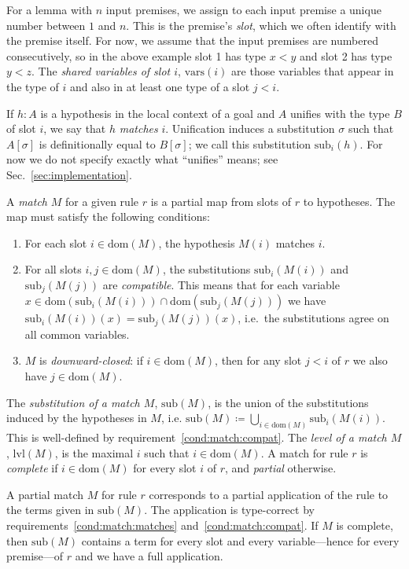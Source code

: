 \documentclass[runningheads]{llncs}
\newcommand{\vars}{\ensuremath{\mathrm{vars}}}
\newcommand{\dom}{\ensuremath{\mathrm{dom}}}
\newcommand{\sub}{\ensuremath{\mathrm{sub}}}
\newcommand{\lvl}{\ensuremath{\mathrm{lvl}}}
\begin{document}
For a lemma with $n$ input premises, we assign to each input premise a unique number between $1$ and $n$.
This is the premise's \emph{slot}, which we often identify with the premise itself.
For now, we assume that the input premises are numbered consecutively, so in the above example slot 1 has type $x < y$ and slot 2 has type $y < z$.
The \emph{shared variables of slot $i$}, $\vars(i)$ are those variables that appear in the type of $i$ and also in at least one type of a slot $j < i$.

If $h : A$ is a hypothesis in the local context of a goal and $A$ unifies with the type $B$ of slot $i$, we say that $h$ \emph{matches} $i$.
Unification induces a substitution $σ$ such that $A[σ]$ is definitionally equal to $B[σ]$; we call this substitution $\sub_{i}(h)$.
For now we do not specify exactly what \enquote{unifies} means; see Sec.~\ref{sec:implementation}.

A \textit{match} $M$ for a given rule $r$ is a partial map from slots of $r$ to hypotheses.
The map must satisfy the following conditions:
\begin{enumerate}
  \item\label{cond:match:matches} For each slot $i ∈ \dom(M)$, the hypothesis $M(i)$ matches $i$.
  \item\label{cond:match:compat} For all slots $i,j ∈ \dom(M)$, the substitutions $\sub_{i}(M(i))$ and $\sub_{j}(M(j))$ are \emph{compatible}.
        This means that for each variable $x ∈ \dom(\sub_{i}(M(i))) ∩ \dom(\sub_{j}(M(j)))$ we have $\sub_{i}(M(i))(x) = \sub_{j}(M(j))(x)$, i.e.\ the substitutions agree on all common variables.
  \item\label{cond:match:closed} $M$ is \emph{downward-closed}: if $i ∈ \dom(M)$, then for any slot $j < i$ of $r$ we also have $j ∈ \dom(M)$.
\end{enumerate}
The \emph{substitution of a match $M$}, $\sub(M)$, is the union of the substitutions induced by the hypotheses in $M$, i.e. $\sub(M) ≔ ⋃_{i ∈ \dom(M)}\sub_{i}(M(i))$.
This is well-defined by requirement~\ref{cond:match:compat}.
The \textit{level of a match $M$}, $\lvl(M)$, is the maximal $i$ such that $i ∈ \dom(M)$.
A match for rule $r$ is \textit{complete} if $i ∈ \dom(M)$ for every slot $i$ of $r$, and \emph{partial} otherwise.

A partial match $M$ for rule $r$ corresponds to a partial application of the rule to the terms given in $\sub(M)$.
The application is type-correct by requirements~\ref{cond:match:matches} and~\ref{cond:match:compat}.
If $M$ is complete, then $\sub(M)$ contains a term for every slot and every variable---hence for every premise---of $r$ and we have a full application.
\end{document}
